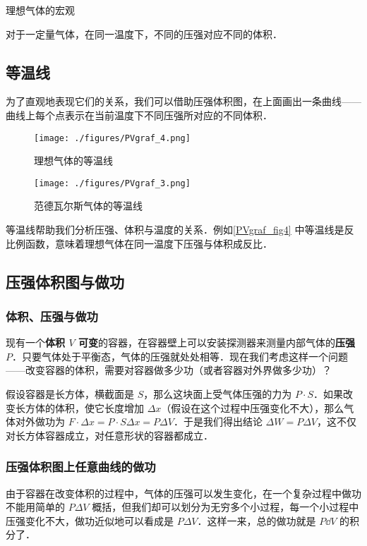 
\begin{issues}
\issueDraft
\end{issues}


理想气体的宏观

对于一定量气体，在同一温度下，不同的压强对应不同的体积．


\subsection{等温线}
为了直观地表现它们的关系，我们可以借助压强体积图，在上面画出一条曲线——曲线上每个点表示在当前温度下不同压强所对应的不同体积．
\begin{figure}[ht]
\centering
\texttt{[image: ./figures/PVgraf\_4.png]}
\caption{理想气体的等温线} \label{PVgraf_fig4}
\end{figure}
\begin{figure}[ht]
\centering
\texttt{[image: ./figures/PVgraf\_3.png]}
\caption{范德瓦尔斯气体的等温线} \label{PVgraf_fig3}
\end{figure}

等温线帮助我们分析压强、体积与温度的关系．例如\autoref{PVgraf_fig4} 中等温线是反比例函数，意味着理想气体在同一温度下压强与体积成反比．

\subsection{压强体积图与做功}

\subsubsection{体积、压强与做功}
现有一个\textbf{体积 $V$ 可变}的容器，在容器壁上可以安装探测器来测量内部气体的\textbf{压强 $P$}．只要气体处于平衡态，气体的压强就处处相等．现在我们考虑这样一个问题——改变容器的体积，需要对容器做多少功（或者容器对外界做多少功）？

假设容器是长方体，横截面是 $S$，那么这块面上受气体压强的力为 $P\cdot S$．如果改变长方体的体积，使它长度增加 $\Delta x$（假设在这个过程中压强变化不大），那么气体对外做功为 $F\cdot \Delta x=P\cdot S\Delta x=P\Delta V$．于是我们得出结论 $\Delta W=P\Delta V$，这不仅对长方体容器成立，对任意形状的容器都成立．
\subsubsection{压强体积图上任意曲线的做功}
由于容器在改变体积的过程中，气体的压强可以发生变化，在一个复杂过程中做功不能用简单的 $P\Delta V$ 概括，但我们却可以划分为无穷多个小过程，每一个小过程中压强变化不大，做功近似地可以看成是 $P\Delta V$．这样一来，总的做功就是 $P\dd V$ 的积分了．

